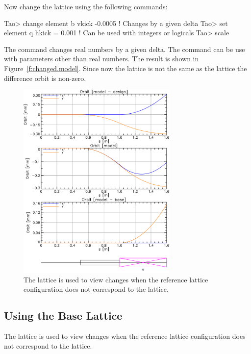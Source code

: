 \documentclass{hitec}
\begin{document}
Now change the  lattice using the following commands:
{\small
\begin{code}
Tao> change element b vkick  -0.0005   ! Changes by a given delta
Tao> set element q hkick = 0.001       ! Can be used with integers or logicals
Tao> scale
\end{code}}
The  command changes real numbers by a given delta. The  command can be use with
parameters other than real numbers.  The result is shown in Figure~\ref{f:changed.model}. Since now
the  lattice is not the same as the  lattice the difference orbit is non-zero.

\begin{figure}[tb]
  \centering
  \includegraphics[width=0.7\textwidth]{with-base.pdf}
  \caption{The  lattice is used to view changes when the reference lattice configuration
does not correspond to the  lattice.}
  \label{f:base}
\end{figure}

\subsection{Using the Base Lattice}

The  lattice is used to view changes when the reference lattice configuration does not
correspond to the  lattice.
\end{document}
